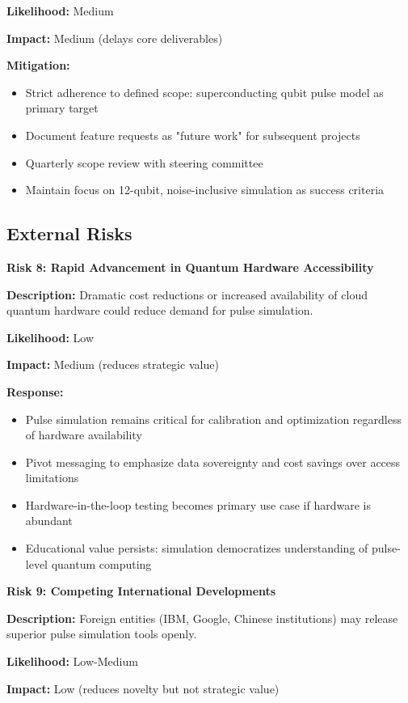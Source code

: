 \documentclass[12pt,a4paper]{article}
\begin{document}
\textbf{Likelihood:} Medium

\textbf{Impact:} Medium (delays core deliverables)

\textbf{Mitigation:}
\begin{itemize}[noitemsep]
\item Strict adherence to defined scope: superconducting qubit pulse model as primary target
\item Document feature requests as "future work" for subsequent projects
\item Quarterly scope review with steering committee
\item Maintain focus on 12-qubit, noise-inclusive simulation as success criteria
\end{itemize}

\subsection{External Risks}

\textbf{Risk 8: Rapid Advancement in Quantum Hardware Accessibility}

\textbf{Description:} Dramatic cost reductions or increased availability of cloud quantum hardware could reduce demand for pulse simulation.

\textbf{Likelihood:} Low

\textbf{Impact:} Medium (reduces strategic value)

\textbf{Response:}
\begin{itemize}[noitemsep]
\item Pulse simulation remains critical for calibration and optimization regardless of hardware availability
\item Pivot messaging to emphasize data sovereignty and cost savings over access limitations
\item Hardware-in-the-loop testing becomes primary use case if hardware is abundant
\item Educational value persists: simulation democratizes understanding of pulse-level quantum computing
\end{itemize}

\textbf{Risk 9: Competing International Developments}

\textbf{Description:} Foreign entities (IBM, Google, Chinese institutions) may release superior pulse simulation tools openly.

\textbf{Likelihood:} Low-Medium

\textbf{Impact:} Low (reduces novelty but not strategic value)
\end{document}
